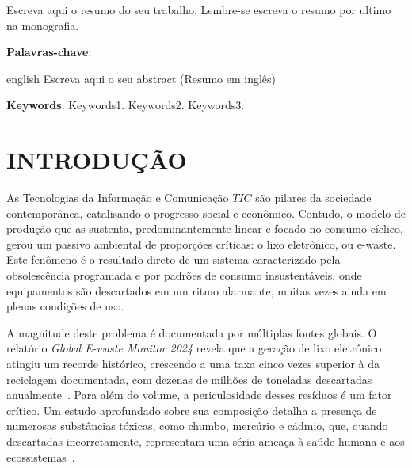 \documentclass[
	12pt,				%
	openright,			%
	oneside,			%
	a4paper,			%
	english,			%
	brazil				%
	]{abntex2}
\theoremstyle{definition}
\begin{document}

\setlength{\absparsep}{18pt} %
\begin{resumo}
Escreva aqui o resumo do seu trabalho. Lembre-se escreva o resumo por ultimo na monografia. 

\textbf{Palavras-chave}: \imprimirpalavraschave{}
\end{resumo}

\begin{resumo}[Abstract]
 \begin{otherlanguage*}{english}
   Escreva aqui o seu abstract (Resumo em inglês)

   \vspace{\onelineskip}

   \noindent 
   \textbf{Keywords}: Keywords1. Keywords2. Keywords3.
 \end{otherlanguage*}
\end{resumo}

\tableofcontents*
\cleardoublepage{}

\textual{}
\pagestyle{simple}

\chapter[INTRODUÇÃO]{INTRODUÇÃO}

As Tecnologias da Informação e Comunicação \(TIC\) são pilares da sociedade contemporânea, catalisando o progresso social e econômico. Contudo, o modelo de produção que as sustenta, predominantemente linear e focado no consumo cíclico, gerou um passivo ambiental de proporções críticas: o lixo eletrônico, ou e-waste. Este fenômeno é o resultado direto de um sistema caracterizado pela obsolescência programada e por padrões de consumo insustentáveis, onde equipamentos são descartados em um ritmo alarmante, muitas vezes ainda em plenas condições de uso.

A magnitude deste problema é documentada por múltiplas fontes globais. O relatório \textit{Global E-waste Monitor 2024} revela que a geração de lixo eletrônico atingiu um recorde histórico, crescendo a uma taxa cinco vezes superior à da reciclagem documentada, com dezenas de milhões de toneladas descartadas anualmente~\cite{forti2024}. Para além do volume, a periculosidade desses resíduos é um fator crítico. Um estudo aprofundado sobre sua composição detalha a presença de numerosas substâncias tóxicas, como chumbo, mercúrio e cádmio, que, quando descartadas incorretamente, representam uma séria ameaça à saúde humana e aos ecossistemas~\cite{perkins2014}.
\end{document}
